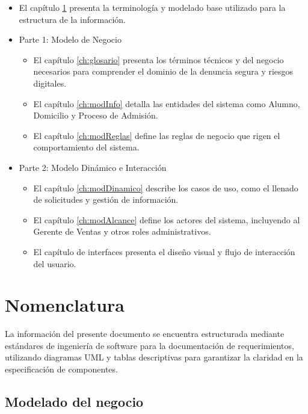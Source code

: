         \begin{itemize}
            \item El capítulo \ref{ch:nomenclatura} presenta la terminología y modelado base utilizado para la estructura de la información.
            \item Parte 1: Modelo de Negocio
                \begin{itemize}
                    \item El capítulo \ref{ch:glosario} presenta los términos técnicos y del negocio necesarios para comprender el dominio de la denuncia segura y riesgos digitales.
                    \item El capítulo \ref{ch:modInfo} detalla las entidades del sistema como Alumno, Domicilio y Proceso de Admisión.
                    \item El capítulo \ref{ch:modReglas} define las reglas de negocio que rigen el comportamiento del sistema.
                \end{itemize}
            \item Parte 2: Modelo Dinámico e Interacción
                \begin{itemize}
                    \item El capítulo \ref{ch:modDinamico} describe los casos de uso, como el llenado de solicitudes y gestión de información.
                    \item El capítulo \ref{ch:modAlcance} define los actores del sistema, incluyendo al Gerente de Ventas y otros roles administrativos.
                    \item El capítulo de interfaces presenta el diseño visual y flujo de interacción del usuario.
                \end{itemize}
        \end{itemize}
    
\chapter{Nomenclatura}
\label{ch:nomenclatura}
    
    La información del presente documento se encuentra estructurada mediante estándares de ingeniería de software para la documentación de requerimientos, utilizando diagramas UML y tablas descriptivas para garantizar la claridad en la especificación de componentes.

    \section{Modelado del negocio}
    
